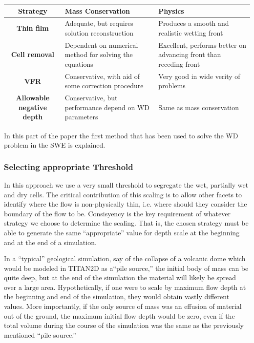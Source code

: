 \documentclass[letterpaper,10pt]{article}
\begin{document}
\begin{center}\label{table1}
\begin{tabular}{|c|p{5cm}|p{5cm}|}
 
\hline
{\bf Strategy}                  & {\bf Mass Conservation}                                          & {\bf Physics} \\
\hline
{\bf Thin film}                 & Adequate, but requires solution reconstruction 
& Produces a smooth and realistic wetting front     \\
\hline 
{\bf Cell removal}              & Dependent on numerical method for solving the equations          & Excellent, performs better on advancing front than receding front \\
\hline
{\bf VFR}                       & Conservative, with aid of some correction procedure              & Very good in wide verity of problems      \\
\hline
{\bf Allowable negative depth}  & Conservative, but performance depend on WD parameters            & Same as mass conservation      \\
\hline
\end{tabular}
\end{center}
In this part of the paper the first method that has been used to solve the WD problem in the SWE is explained.
\subsubsection{Selecting appropriate Threshold} \label{Threshold}
In this approach we use a very small threshold to segregate the wet, partially wet and dry cells.
The critical contribution of this scaling is to allow other
facets to identify where the flow %
is non-physically thin, i.e. where should they consider the boundary of
the flow to be. Consisyency is the key requirement of whatever strategy we choose to
determine the scaling. That is, the
chosen strategy must be able to generate the same ``appropriate'' value
for depth scale at the beginning and at the end of a simulation.  \newline

In a ``typical'' geological simulation, say of the collapse of a volcanic 
dome which would be modeled in TITAN2D as a``pile source,'' the initial 
body of mass can be quite deep, but at the end of the simulation the 
material will likely be spread over a large area.  Hypothetically, if one 
were to scale by maximum flow depth at the beginning and end of the 
simulation, they would obtain vastly different values.  More importantly, 
if the only source of mass was an effusion of material out of the ground, 
the maximum initial flow depth would be zero, even if the total volume 
during the course of the simulation was the same as the previously 
mentioned ``pile source.''  \newline
\end{document}
